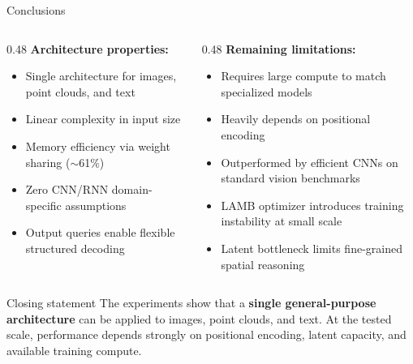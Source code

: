 \documentclass[aspectratio=169,11pt]{beamer}
\begin{document}
\begin{frame}[shrink=15]{Conclusions}
  \begin{columns}[T]
    \begin{column}{0.48\textwidth}
      \textbf{Architecture properties:}
      \begin{itemize}
        \item Single architecture for images, point clouds, and text
        \item Linear complexity in input size
        \item Memory efficiency via weight sharing ($\sim$61\%)
        \item Zero CNN/RNN domain-specific assumptions
        \item Output queries enable flexible structured decoding
      \end{itemize}
    \end{column}
    \begin{column}{0.48\textwidth}
      \textbf{Remaining limitations:}
      \begin{itemize}
        \item Requires large compute to match specialized models
        \item Heavily depends on positional encoding
        \item Outperformed by efficient CNNs on standard vision benchmarks
        \item LAMB optimizer introduces training instability at small scale
        \item Latent bottleneck limits fine-grained spatial reasoning
      \end{itemize}
    \end{column}
  \end{columns}

  \vspace{0.5em}
  \begin{exampleblock}{Closing statement}
    The experiments show that a \textbf{single general-purpose architecture} can be applied to images, point clouds, and text. At the tested scale, performance depends strongly on positional encoding, latent capacity, and available training compute.
  \end{exampleblock}
\end{frame}

\end{document}
